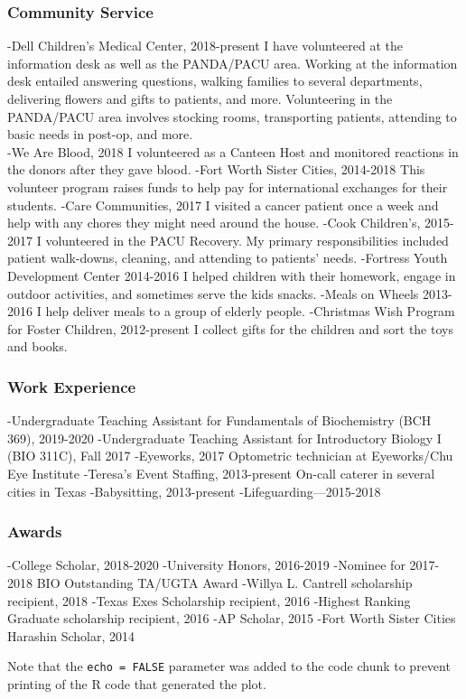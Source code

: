 \documentclass[]{article}
\begin{document}
\subsubsection{Community Service}\label{community-service}

-Dell Children's Medical Center, 2018-present I have volunteered at the
information desk as well as the PANDA/PACU area. Working at the
information desk entailed answering questions, walking families to
several departments, delivering flowers and gifts to patients, and more.
Volunteering in the PANDA/PACU area involves stocking rooms,
transporting patients, attending to basic needs in post-op, and more.\\
-We Are Blood, 2018 I volunteered as a Canteen Host and monitored
reactions in the donors after they gave blood. -Fort Worth Sister
Cities, 2014-2018 This volunteer program raises funds to help pay for
international exchanges for their students. -Care Communities, 2017 I
visited a cancer patient once a week and help with any chores they might
need around the house. -Cook Children's, 2015-2017 I volunteered in the
PACU Recovery. My primary responsibilities included patient walk-downs,
cleaning, and attending to patients' needs. -Fortress Youth Development
Center 2014-2016 I helped children with their homework, engage in
outdoor activities, and sometimes serve the kids snacks. -Meals on
Wheels 2013-2016 I help deliver meals to a group of elderly people.
-Christmas Wish Program for Foster Children, 2012-present I collect
gifts for the children and sort the toys and books.

\subsubsection{Work Experience}\label{work-experience}

-Undergraduate Teaching Assistant for Fundamentals of Biochemistry (BCH
369), 2019-2020 -Undergraduate Teaching Assistant for Introductory
Biology I (BIO 311C), Fall 2017 -Eyeworks, 2017 Optometric technician at
Eyeworks/Chu Eye Institute -Teresa's Event Staffing, 2013-present
On-call caterer in several cities in Texas -Babysitting, 2013-present
-Lifeguarding---2015-2018

\subsubsection{Awards}\label{awards}

-College Scholar, 2018-2020 -University Honors, 2016-2019 -Nominee for
2017-2018 BIO Outstanding TA/UGTA Award -Willya L. Cantrell scholarship
recipient, 2018 -Texas Exes Scholarship recipient, 2016 -Highest Ranking
Graduate scholarship recipient, 2016 -AP Scholar, 2015 -Fort Worth
Sister Cities Harashin Scholar, 2014

Note that the \texttt{echo\ =\ FALSE} parameter was added to the code
chunk to prevent printing of the R code that generated the plot.
\end{document}
